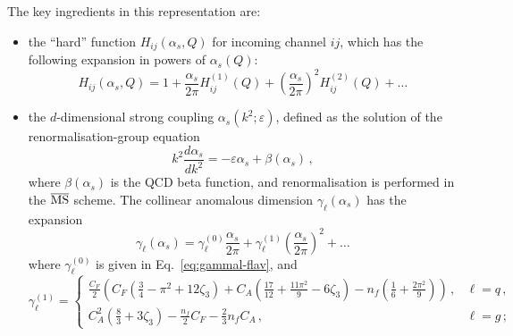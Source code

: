 The key ingredients in this representation are:
\begin{itemize}
\item
  the ``hard'' function $H_{ij}(\alpha_s,Q)$ for incoming channel $ij$, which has the following expansion in powers of $\alpha_s(Q)$:
  \begin{equation}
    \label{eq:HQ-exp}
    H_{ij}(\alpha_s,Q) = 1+\frac{\alpha_s}{2\pi}H_{ij}^{(1)}(Q) +\left(\frac{\alpha_s}{2\pi}\right)^2H_{ij}^{(2)}(Q)+\dots 
  \end{equation}
  
\item the $d$-dimensional strong coupling $\alpha_s(k^2;\varepsilon)$, defined as the solution of the renormalisation-group equation
\begin{equation}
  \label{eq:RG-coupling}
  k^2\frac{d\alpha_s}{dk^2} = - \varepsilon \alpha_s+\beta(\alpha_s)\,,
\end{equation}
where $\beta(\alpha_s)$ is the QCD beta function, and renormalisation
is performed in the $\overline{\rm MS}$ scheme. The collinear anomalous dimension $\gamma_\ell(\alpha_s)$ has the expansion 
\begin{equation}
  \label{eq:gammal}
  \gamma_\ell (\alpha_s) = \gamma^{(0)}_\ell \frac{\alpha_s}{2\pi} + \gamma^{(1)}_\ell \left(\frac{\alpha_s}{2\pi} \right)^2+\dots
\end{equation}
where $\gamma_\ell^{(0)}$ is given in Eq.~\eqref{eq:gammal-flav}, and 
 \begin{equation}
  \label{eq:gammal1-flav}
  \gamma_\ell^{(1)} = \begin{cases}
      \frac{C_F}{2}\left(C_F\left(\frac{3}{4}-\pi^2+12\zeta_3\right)+C_A\left(\frac{17}{12}+\frac{11\pi^2}{9}-6\zeta_3\right)-n_f\left(\frac{1}{6}+\frac{2\pi^2}{9}\right)\right)\,, & \ell = q\,, \\[1ex]
      C_A^2\left(\frac{8}{3}+3\zeta_3\right)-\frac{n_f}{2}C_F-\frac{2}{3}n_fC_A \,, & \ell = g\,;
    \end{cases}
\end{equation}


\end{itemize}
